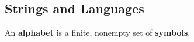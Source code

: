 



















\subsection{Strings and Languages}

\begin{definition} An \textbf{alphabet} is a finite, nonempty set of
\textbf{symbols}. \end{definition}

